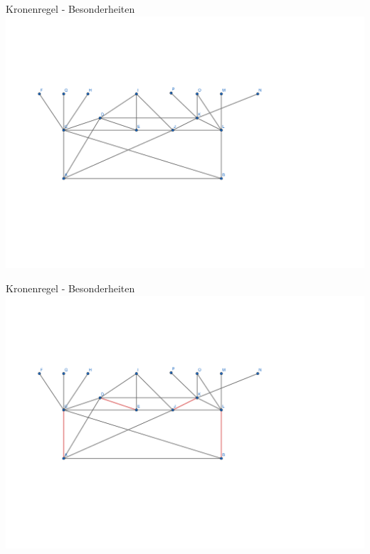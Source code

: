 \documentclass{beamer}
\begin{document}
\begin{frame}{Kronenregel - Besonderheiten}
\includegraphics[scale=.3]{Crown1.pdf} 
\end{frame}
\begin{frame}{Kronenregel - Besonderheiten}
\includegraphics[scale=.3]{Crown2.pdf} 
\end{frame}
\end{document}
